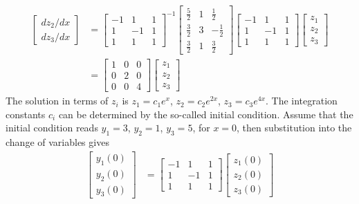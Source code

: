 \begin{exmp}
\begin{align*}
\begin{bmatrix}
dz_2/dx \\
dz_3/dx
\end{bmatrix}
&=
\begin{bmatrix}
-1 & 1 & 1 \\
1 & -1 & 1 \\
1 & 1 & 1
\end{bmatrix}^{-1}
\begin{bmatrix}
\frac{5}{2} & 1 & \frac{1}{2} \\
\frac{3}{2} & 3 & -\frac{1}{2} \\
\frac{3}{2} & 1 & \frac{3}{2}
\end{bmatrix}
\begin{bmatrix}
-1 & 1 & 1 \\
1 & -1 & 1 \\
1 & 1 & 1
\end{bmatrix}
\begin{bmatrix}
z_1 \\
z_2 \\
z_3
\end{bmatrix} \\
&=
\begin{bmatrix}
1 & 0 & 0\\
0 & 2 & 0\\
0 & 0 & 4
\end{bmatrix}
\begin{bmatrix}
z_1 \\
z_2 \\
z_3
\end{bmatrix}
\end{align*}
The solution in terms of $z_i$ is $z_1 = c_1e^x$, $z_2 = c_2e^{2x}$, $z_3 = c_3e^{4x}$. The integration constants $c_i$ can be determined by the so-called initial condition. Assume that the initial condition reads $y_1 = 3$, $y_2 = 1$, $y_3 = 5$, for $x = 0$, then substitution into the change of variables gives
\begin{align*}
\begin{bmatrix}
y_1(0) \\
y_2(0) \\
y_3(0)
\end{bmatrix}
&=
\begin{bmatrix}
-1 & 1 & 1 \\
1 & -1 & 1 \\
1 & 1 & 1
\end{bmatrix}
\begin{bmatrix}
z_1(0) \\
z_2(0) \\
z_3(0)
\end{bmatrix} \\

\end{align*}
\end{exmp}
